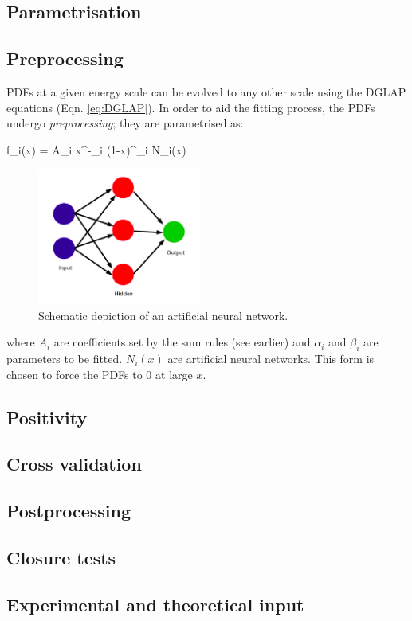 \subsection{Parametrisation}
\subsection{Preprocessing}
PDFs at a given energy scale can be evolved to any other scale using the DGLAP equations 
(Eqn. \ref{eq:DGLAP}).
In order to aid the fitting process, the PDFs undergo \textit{preprocessing};
they are parametrised as:

\beq
  f_i(x) = A_i x^{-\alpha_i} (1-x)^{\beta_i} N_i(x)
\eeq

\begin{figure}
\centering
\includegraphics[width=0.48\textwidth]{background/nnet.png}
\caption{Schematic depiction of an artificial neural network.}
\label{nnet}
\end{figure}
where $A_i$ are coefficients set by the sum rules (see earlier) and $\alpha_i$ and $\beta_i$ are parameters
to be fitted. $N_i(x)$ are artificial neural networks. This form is chosen to force the 
PDFs to 0 at large $x$. 
\subsection{Positivity}
\subsection{Cross validation}
\subsection{Postprocessing}
\subsection{Closure tests}
\subsection{Experimental and theoretical input}
